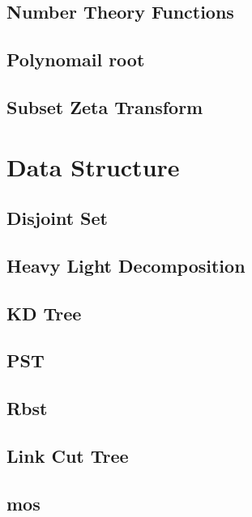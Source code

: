 \subsection{Number Theory Functions}

\subsection{Polynomail root}

\subsection{Subset Zeta Transform}


\section{Data Structure}
\subsection{Disjoint Set}

\subsection{Heavy Light Decomposition}

\subsection{KD Tree}

%
\subsection{PST}

\subsection{Rbst}

\subsection{Link Cut Tree}

\subsection{mos}

